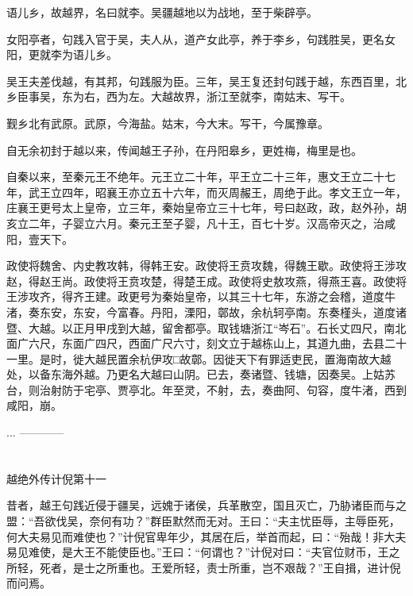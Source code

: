 \documentclass[12pt,UTF8]{ctexbook}
\begin{document}
语儿乡，故越界，名曰就李。吴疆越地以为战地，至于柴辟亭。

女阳亭者，句践入官于吴，夫人从，道产女此亭，养于李乡，句践胜吴，更名女阳，更就李为语儿乡。

吴王夫差伐越，有其邦，句践服为臣。三年，吴王复还封句践于越，东西百里，北乡臣事吴，东为右，西为左。大越故界，浙江至就李，南姑末、写干。

觐乡北有武原。武原，今海盐。姑末，今大末。写干，今属豫章。

自无余初封于越以来，传闻越王子孙，在丹阳皋乡，更姓梅，梅里是也。

自秦以来，至秦元王不绝年。元王立二十年，平王立二十三年，惠文王立二十七年，武王立四年，昭襄王亦立五十六年，而灭周赧王，周绝于此。孝文王立一年，庄襄王更号太上皇帝，立三年，秦始皇帝立三十七年，号曰赵政，政，赵外孙，胡亥立二年，子婴立六月。秦元王至子婴，凡十王，百七十岁。汉高帝灭之，治咸阳，壹天下。

政使将魏舍、内史教攻韩，得韩王安。政使将王贲攻魏，得魏王歇。政使将王涉攻赵，得赵王尚。政使将王贲攻楚，得楚王成。政使将史敖攻燕，得燕王喜。政使将王涉攻齐，得齐王建。政更号为秦始皇帝，以其三十七年，东游之会稽，道度牛渚，奏东安，东安，今富春。丹阳，溧阳，鄣故，余杭轲亭南。东奏槿头，道度诸暨、大越。以正月甲戌到大越，留舍都亭。取钱塘浙江“岑石”。石长丈四尺，南北面广六尺，东面广四尺，西面广尺六寸，刻文立于越栋山上，其道九曲，去县二十一里。是时，徙大越民置余杭伊攻□故鄣。因徙天下有罪适吏民，置海南故大越处，以备东海外越。乃更名大越曰山阴。已去，奏诸暨、钱塘，因奏吴。上姑苏台，则治射防于宅亭、贾亭北。年至灵，不射，去，奏曲阿、句容，度牛渚，西到咸阳，崩。

...
------------

\part{}

越绝外传计倪第十一

昔者，越王句践近侵于疆吴，远媿于诸侯，兵革散空，国且灭亡，乃胁诸臣而与之盟：“吾欲伐吴，奈何有功？”群臣默然而无对。王曰：“夫主忧臣辱，主辱臣死，何大夫易见而难使也？”计倪官卑年少，其居在后，举首而起，曰：“殆哉！非大夫易见难使，是大王不能使臣也。”王曰：“何谓也？”计倪对曰：“夫官位财币，王之所轻，死者，是士之所重也。王爱所轻，责士所重，岂不艰哉？”王自揖，进计倪而问焉。
\end{document}
